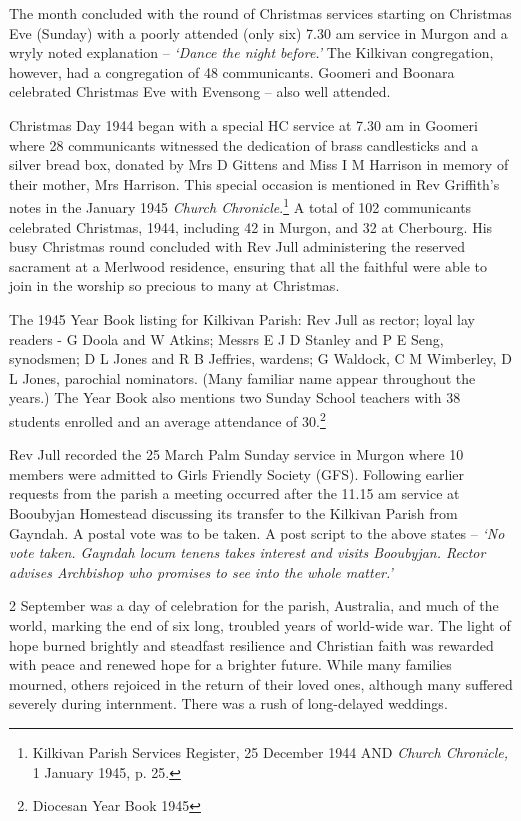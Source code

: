 The month concluded with the round of Christmas services starting on Christmas Eve (Sunday) with a poorly attended (only six) 7.30 am service in Murgon and a wryly noted explanation -- \emph{`Dance the night before.'} The Kilkivan congregation, however, had a congregation of 48 communicants. Goomeri and Boonara celebrated Christmas Eve with Evensong -- also well attended.

Christmas Day 1944 began with a special HC service at 7.30 am in Goomeri where 28 communicants witnessed the dedication of brass candlesticks and a silver bread box, donated by Mrs D Gittens and Miss I M Harrison in memory of their mother, Mrs Harrison. This special occasion is mentioned in Rev Griffith's notes in the January 1945 \emph{Church Chronicle}.\footnote{Kilkivan Parish Services Register, 25 December 1944 AND \emph{Church Chronicle,} 1 January 1945, p. 25.} A total of 102 communicants celebrated Christmas, 1944, including 42 in Murgon, and 32 at Cherbourg. His busy Christmas round concluded with Rev Jull administering the reserved sacrament at a Merlwood residence, ensuring that all the faithful were able to join in the worship so precious to many at Christmas.

The 1945 Year Book listing for Kilkivan Parish: Rev Jull as rector; loyal lay readers - G Doola and W Atkins; Messrs E J D Stanley and P E Seng, synodsmen; D L Jones and R B Jeffries, wardens; G Waldock, C M Wimberley, D L Jones, parochial nominators. (Many familiar name appear throughout the years.) The Year Book also mentions two Sunday School teachers with 38 students enrolled and an average attendance of 30.\footnote{Diocesan Year Book 1945}

Rev Jull recorded the 25 March Palm Sunday service in Murgon where 10 members were admitted to Girls Friendly Society (GFS). Following earlier requests from the parish a meeting occurred after the 11.15 am service at Booubyjan Homestead discussing its transfer to the Kilkivan Parish from Gayndah. A postal vote was to be taken. A post script to the above states -- \emph{`No vote taken. Gayndah locum tenens takes interest and visits Booubyjan. Rector advises Archbishop who promises to see into the whole matter.'}

2 September was a day of celebration for the parish, Australia, and much of the world, marking the end of six long, troubled years of world-wide war. The light of hope burned brightly and steadfast resilience and Christian faith was rewarded with peace and renewed hope for a brighter future. While many families mourned, others rejoiced in the return of their loved ones, although many suffered severely during internment. There was a rush of long-delayed weddings.

